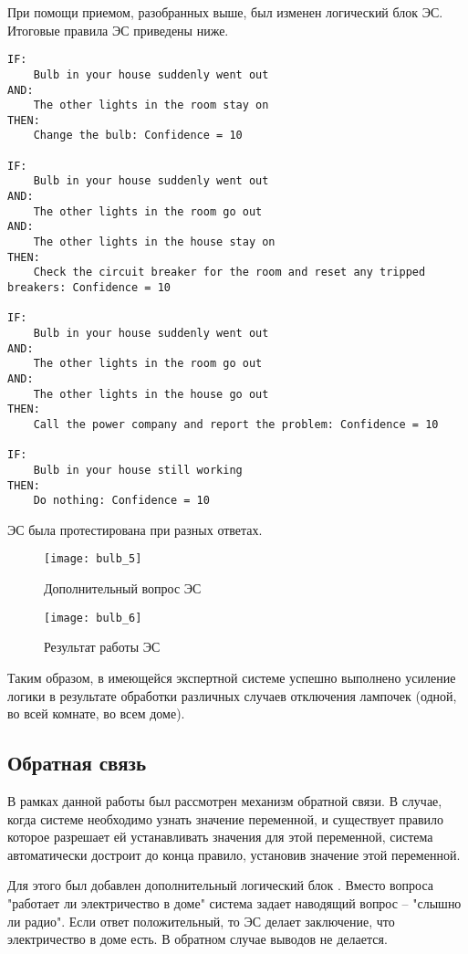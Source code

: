 При помощи приемом, разобранных выше, был изменен логический блок ЭС. Итоговые правила ЭС приведены ниже.

\begin{lstlisting}[caption={Алгоритм работы ЭС}]
IF:
	Bulb in your house suddenly went out
AND:
	The other lights in the room stay on
THEN:
	Change the bulb: Confidence = 10

IF:
	Bulb in your house suddenly went out
AND:
	The other lights in the room go out
AND:
	The other lights in the house stay on
THEN:
	Check the circuit breaker for the room and reset any tripped breakers: Confidence = 10

IF:
	Bulb in your house suddenly went out
AND:
	The other lights in the room go out
AND:
	The other lights in the house go out
THEN:
	Call the power company and report the problem: Confidence = 10

IF:
	Bulb in your house still working
THEN:
	Do nothing: Confidence = 10
\end{lstlisting}

ЭС была протестирована при разных ответах. 

\begin{figure}[H]
	\centering
	\texttt{[image: bulb\_5]}
	\caption{Дополнительный вопрос ЭС}
\end{figure}

\begin{figure}[H]
	\centering
	\texttt{[image: bulb\_6]}
	\caption{Результат работы ЭС}
\end{figure}

Таким образом, в имеющейся экспертной системе успешно выполнено усиление логики в результате обработки различных случаев отключения лампочек (одной, во всей комнате, во всем доме).

\subsection{Обратная связь}

В рамках данной работы был рассмотрен механизм обратной связи. В случае, когда системе необходимо узнать значение переменной, и существует правило которое разрешает ей устанавливать значения для этой переменной, система автоматически достроит до конца правило, установив значение этой переменной. 

Для этого был добавлен дополнительный логический блок . Вместо вопроса "работает ли электричество в доме" система задает наводящий вопрос -- "слышно ли радио". Если ответ положительный, то ЭС делает заключение, что электричество в доме есть. В обратном случае выводов не делается.

